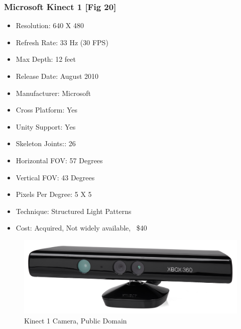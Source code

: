 \documentclass[a4paper,10pt]{article}
\begin{document}
\subsubsection{Microsoft Kinect 1 [Fig 20]}
\begin{itemize}
  \item Resolution: 640 X 480
  \item Refresh Rate: 33 Hz (30 FPS)
  \item Max Depth: 12 feet
  \item Release Date: August 2010 
  \item Manufacturer: Microsoft
  \item Cross Platform: Yes
  \item Unity Support: Yes
  \item Skeleton Joints:: 26
  \item Horizontal FOV: 57 Degrees
  \item Vertical FOV: 43 Degrees
  \item Pixels Per Degree: 5 X 5
  \item Technique: Structured Light Patterns
  \item Cost: Acquired, Not widely available, ~\$40
\end{itemize}
\begin{figure}[H]
	\includegraphics[width=\linewidth,height=\paperheight,keepaspectratio]{kinect1.png}
	\caption{Kinect 1 Camera, Public Domain}
	\label{fig:k1Cam}
	\end{figure}
	\pagebreak
\end{document}
